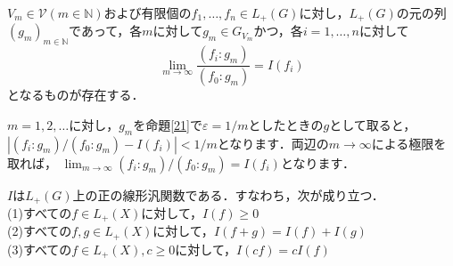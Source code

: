 \begin{cor}\label{22}
$V_m \in \mathscr{V}(m \in \mathbb{N})$および有限個の$f_1, \ldots , f_n \in L_{+}(G)$に対し，$L_{+}(G)$の元の列$(g_m)_{m \in \mathbb{N}}$であって，各$m$に対して$g_m \in G_{V_m}$かつ，各$i=1, \ldots , n$に対して 
\[
\lim_{m \to \infty} \frac{(f_i \colon g_m )}{( f_0 \colon g_m )} =I(f_i)
\]
となるものが存在する．
\end{cor}
\begin{Proof}
$m=1,2, \ldots$に対し，$g_m$を命題\ref{21}で$\varepsilon = 1/m$としたときの$g$として取ると，$|(f_i \colon g_m ) / ( f_0 \colon g_m ) -I(f_i) | < 1/m$となります．両辺の$m \to \infty$による極限を取れば， $\lim_{m \to \infty} (f_i \colon g_m ) / ( f_0 \colon g_m ) =I(f_i)$となります．　
\end{Proof}

\begin{prop}\label{23}
$I$は$L_{+}(G)$上の正の線形汎関数である．すなわち，次が成り立つ． \\
(1)すべての$f \in L_{+}(X)$に対して，$I(f) \ge 0$\\
(2)すべての$f,g \in L_{+}(X)$に対して，$I(f+g)=I(f)+I(g)$\\
(3)すべての$f \in L_{+}(X), c \ge 0$に対して，$I(cf)=cI(f)$
\end{prop}
